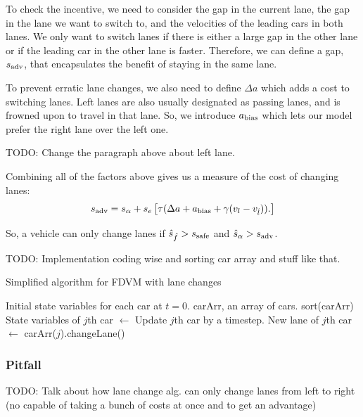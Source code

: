 \documentclass[12pt]{article}
\begin{document}
      To check the incentive, we need to consider the gap in the current lane, the gap in the lane we want to switch to, and the velocities of the leading cars in both lanes. We only want to switch lanes if there is either a large gap in the other lane or if the leading car in the other lane is faster. Therefore, we can define a gap, $s_{\rm adv}$, that encapsulates the benefit of staying in the same lane. 
      
      To prevent erratic lane changes, we also need to define $\Delta a$ which adds a cost to switching lanes.  Left lanes are also usually designated as passing lanes, and is frowned upon to travel in that lane. So, we introduce $a_{\rm bias}$ which lets our model prefer the right lane over the left one. 
      
      TODO: Change the paragraph above about left lane. 

      Combining all of the factors above gives us a measure of the cost of changing lanes:
      \begin{equation}
        s_{\rm adv} = s_{\alpha} + s_e\left[\tau(\Delta a + a_{\rm bias} + \gamma(v_l - v_{\hat l})).\right]
      \end{equation}

      So, a vehicle can only change lanes if $\hat s_{\hat f} > s_{\rm safe}$ and $\hat s_{\alpha} > s_{\rm adv}$. 

      TODO: Implementation coding wise and sorting car array and stuff like that. 
      \begin{algorithm}
        \caption{Simplified algorithm for FDVM with lane changes}\label{alg:car-following-lane}
        \begin{algorithmic}
        \Require Initial state variables for each car at $t=0$. 
        \Require carArr, an array of cars.
        \State sort(carArr)
          \State State variables of $j$th car $\gets$ Update $j$th car by a timestep.
          \State New lane of $j$th car $\gets$ carArr($j$).changeLane()
          \EndFor
        \EndFor
        \end{algorithmic}
        \end{algorithm}
    \subsubsection{Pitfall}
    TODO: Talk about how lane change alg. can only change lanes from left to right (no capable of taking a bunch of costs at once and to get an advantage)
\end{document}
